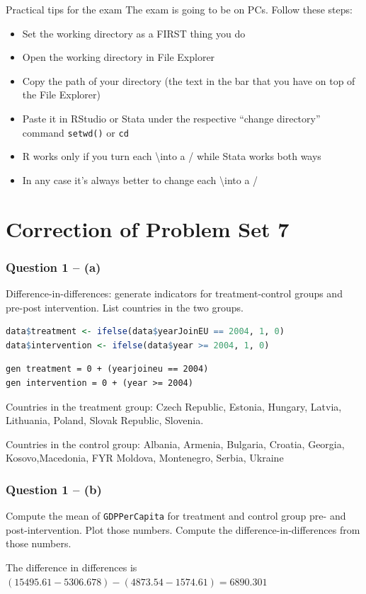 \documentclass[xcolor=table,dvipsnames]{beamer}
\begin{document}
\begin{frame}{Practical tips for the exam}
The exam is going to be on PCs. Follow these steps:
\begin{itemize}
\item Set the working directory as a FIRST thing you do \pause
\item Open the working directory in File Explorer \pause
\item Copy the path of your directory (the text in the bar that you have on top of the File Explorer) \pause
\item Paste it in RStudio or Stata under the respective ``change directory'' command \texttt{setwd()} or \texttt{cd} \pause
\item R works only if you turn each \textbackslash into a / while Stata works both ways \pause
\item In any case it's always better to change each \textbackslash into a /
\end{itemize}
\end{frame}

\section{Correction of Problem Set 7}

\begin{frame}[fragile]
\frametitle{Question 1 -- (a)}
Difference-in-differences: generate indicators for treatment-control groups and pre-post intervention. List countries in the two groups. \pause

\begin{lstlisting}[language = R]
data$treatment <- ifelse(data$yearJoinEU == 2004, 1, 0)
data$intervention <- ifelse(data$year >= 2004, 1, 0)
\end{lstlisting}
\begin{lstlisting}
gen treatment = 0 + (yearjoineu == 2004)
gen intervention = 0 + (year >= 2004)
\end{lstlisting} \pause
Countries in the treatment group: Czech Republic, Estonia, Hungary, Latvia, Lithuania, Poland, Slovak Republic, Slovenia. \pause

Countries in the control group: Albania, Armenia, Bulgaria, Croatia, Georgia, Kosovo,Macedonia, FYR Moldova, Montenegro, Serbia, Ukraine
\end{frame}

\begin{frame}
\frametitle{Question 1 -- (b)}
Compute the mean of \texttt{GDPPerCapita} for treatment and control group pre- and post-intervention. Plot those numbers. Compute the difference-in-differences from those numbers. \pause

The difference in differences is  $(15495.61-5306.678)-(4873.54-1574.61)=6890.301$
\end{frame}
\end{document}
